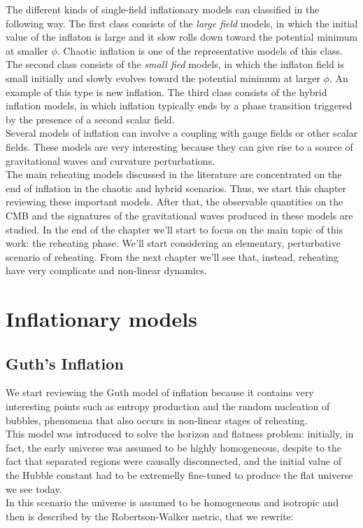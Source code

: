 \documentclass[11pt,a4paper,twoside]{book}
\begin{document}
The different kinds of single-field inflationary models can classified in the following way. The first class consists of the \textit{large field} models, in which the initial value of the inflaton is large and it slow rolls down toward  the potential minimum at smaller $\phi$. Chaotic inflation is one of the representative models of this class. The second class consists of the \textit{small fied} models, in which the inflaton field is small initially and slowly evolves toward the potential minimum at larger $\phi$. An example of this type is new inflation. The third class consists of the hybrid inflation models, in which inflation typically ends by a phase transition triggered by the presence of a second scalar field.\\
Several models of inflation can involve a coupling with gauge fields or other scalar fields. These models are very interesting because they can give rise to a source of gravitational waves and curvature perturbations. \\
The main reheating models discussed in the literature are concentrated on the end of inflation in the chaotic and hybrid scenarios. Thus, we start this chapter reviewing these important models. After that, the observable quantities on the CMB and the signatures of the gravitational waves produced in these models are studied. In the end of the chapter we'll start to focus on the main topic of this work: the reheating phase. We'll start considering an elementary, perturbative scenario of reheating. From the next chapter we'll see that, instead, reheating have very complicate and non-linear dynamics. 

\section{Inflationary models}
\subsection{Guth's Inflation}
We start reviewing the Guth model of inflation because it contains very interesting points such as entropy production and the random nucleation of bubbles, phenomena that also occurs in non-linear stages of reheating.\\
This model was introduced to solve the horizon and flatness problem: initially, in fact, the early universe was assumed to be highly homogeneous, despite to the fact that separated regions were causally disconnected, and the initial value of the Hubble constant had to be extremelly fine-tuned to produce the flat universe we see today.\\
In this scenario the universe is assumed to be homogeneous and isotropic and then is described by the Robertson-Walker metric, that we rewrite:
\end{document}
